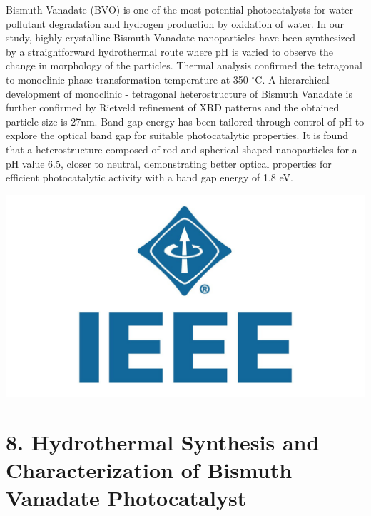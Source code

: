 \documentclass[a4paper,20pt]{article}
\begin{document}
    \begin{minipage}{.69\linewidth} \begin{flushleft}
    
    		 Bismuth Vanadate (BVO) is one of the most potential photocatalysts for water pollutant degradation and hydrogen production by oxidation of water. In our study, highly crystalline Bismuth Vanadate nanoparticles have been synthesized by a straightforward hydrothermal route where pH is varied to observe the change in morphology of the particles. Thermal analysis confirmed the tetragonal to monoclinic phase transformation temperature at 350 $^{\circ}$C. A hierarchical development of monoclinic - tetragonal heterostructure of Bismuth Vanadate is further confirmed by Rietveld refinement of XRD patterns and the obtained particle size is 27nm. Band gap energy has been tailored through control of pH to explore the optical band gap for suitable photocatalytic properties. It is found that a heterostructure composed of rod and spherical shaped nanoparticles for a pH value 6.5, closer to neutral, demonstrating better optical properties for efficient photocatalytic activity with a band gap energy of 1.8 eV.
    	\end{flushleft} \end{minipage}
    	 \hfill 
    \begin{minipage}{0.29\linewidth}\begin{flushright}
    	 	\includegraphics[width=1.0\linewidth]{ieee}\\
    	\end{flushright}\end{minipage}
    	
\vspace{8pt}


\section{\textbf{8. Hydrothermal Synthesis and Characterization of Bismuth Vanadate Photocatalyst}}
\end{document}
